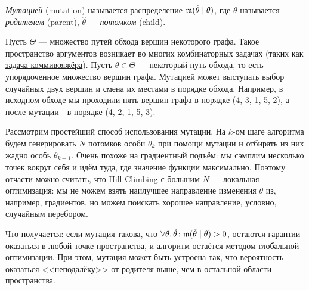 \newcommand{\mut}{\mathfrak{m}}
\newcommand{\Mut}{\mathfrak{M}}
\begin{definition}
\emph{Мутацией} (mutation) называется распределение $\mut(\hat{\theta} \HM\mid \theta)$, где $\theta$ называется \emph{родителем} (parent), $\hat{\theta}$ --- \emph{потомком} (child).
\end{definition}

\begin{exampleBox}[label=ex:graph_mutation]{}
Пусть $\Theta$ --- множество путей обхода вершин некоторого графа. Такое пространство аргументов возникает во многих комбинаторных задачах (таких как \href{https://ru.wikipedia.org/wiki/\%D0\%97\%D0\%B0\%D0\%B4\%D0\%B0\%D1\%87\%D0\%B0_\%D0\%BA\%D0\%BE\%D0\%BC\%D0\%BC\%D0\%B8\%D0\%B2\%D0\%BE\%D1\%8F\%D0\%B6\%D1\%91\%D1\%80\%D0\%B0}{задача коммивояжёра}). Пусть $\theta \in \Theta$ --- некоторый путь обхода, то есть упорядоченное множество вершин графа. Мутацией может выступать выбор случайных двух вершин и смена их местами в порядке обхода. Например, в исходном обходе мы проходили пять вершин графа в порядке (4, 3, 1, 5, 2), а после мутации - в порядке (4, 2, 1, 5, 3). 
\end{exampleBox}

Рассмотрим простейший способ использования мутации. На $k$-ом шаге алгоритма будем генерировать $N$ потомков особи $\theta_k$ при помощи мутации и отбирать из них жадно особь $\theta_{k+1}$. Очень похоже на градиентный подъём: мы сэмплим несколько точек вокруг себя и идём туда, где значение функции максимально. Поэтому отчасти можно считать, что Hill Climbing с большим $N$ --- локальная оптимизация: мы не можем взять наилучшее направление изменения $\theta$ из, например, градиентов, но можем поискать хорошее направление, условно, случайным перебором.

\begin{example}
\begin{center}
\end{center}
\end{example}

Что получается: если мутация такова, что $\forall \theta, \hat{\theta} \colon \mut(\hat{\theta} \HM\mid \theta) \HM> 0$, остаются гарантии оказаться в любой точке пространства, и алгоритм остаётся методом глобальной оптимизации. При этом, мутация может быть устроена так, что вероятность оказаться <<неподалёку>> от родителя выше, чем в остальной области пространства. 

